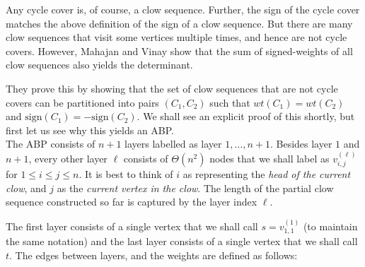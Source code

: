 Any cycle cover is, of course, a clow sequence.
Further, the sign of the cycle cover matches the above definition of the sign of a clow sequence.
But there are many clow sequences that visit some vertices multiple times, and hence are not cycle covers. 
However, Mahajan and Vinay show that the sum of signed-weights of all clow sequences also yields the determinant.

\begin{lemma}[\cite{mv97}]\label{lem:mv-clowseq} If $A_G$ is the adjacency matrix of a graph $G$, then
\begin{eqnarray*}
\det(A_G) & = &  \sum_{C \in \mathrm{CycleCover(G)}} wt(C) \cdot \mathrm{sign}(C)\\
& = & \sum_{C \in \mathrm{ClowSequence(G)}} wt(C) \cdot \mathrm{sign}(C),
\end{eqnarray*}
where $\mathrm{ClowSequence(G)}}$ denotes the set of clow sequences of $G$ of length $n$.
\end{lemma}

They prove this by showing that the set of clow sequences that are not cycle covers can be partitioned into pairs $(C_1,C_2)$ such that $wt(C_1) = wt(C_2)$ and $\mathrm{sign}(C_1) = - \mathrm{sign}(C_2)$.
We shall see an explicit proof of this shortly, but first let us see why this yields an ABP. \\

The ABP consists of $n+1$ layers labelled as layer $1,\dots, n+1$.
Besides layer $1$ and $n+1$, every other layer $\ell$ consists of $\Theta(n^2)$ nodes that we shall label as $v_{i,j}^{(\ell)}$ for $1\leq i\leq j\leq n$.
It is best to think of $i$ as representing the \emph{head of the current clow}, and $j$ as the \emph{current vertex in the clow}.
The length of the partial clow sequence constructed so far is captured by the layer index $\ell$.

The first layer consists of a single vertex that we shall call $s = v_{1,1}^{(1)}$ (to maintain the same notation)  and the last layer consists of a single vertex that we shall call $t$.
The edges between layers, and the weights are defined as follows:

